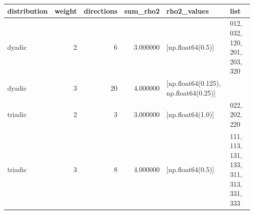 \begin{tabular}{lrrrll}
\toprule
distribution & weight & directions & sum_rho2 & rho2_values & list \\
\midrule
dyadic & 2 & 6 & 3.000000 & [np.float64(0.5)] & 012, 032, 120, 201, 203, 320 \\
dyadic & 3 & 20 & 4.000000 & [np.float64(0.125), np.float64(0.25)] &  \\
triadic & 2 & 3 & 3.000000 & [np.float64(1.0)] & 022, 202, 220 \\
triadic & 3 & 8 & 4.000000 & [np.float64(0.5)] & 111, 113, 131, 133, 311, 313, 331, 333 \\
\bottomrule
\end{tabular}
